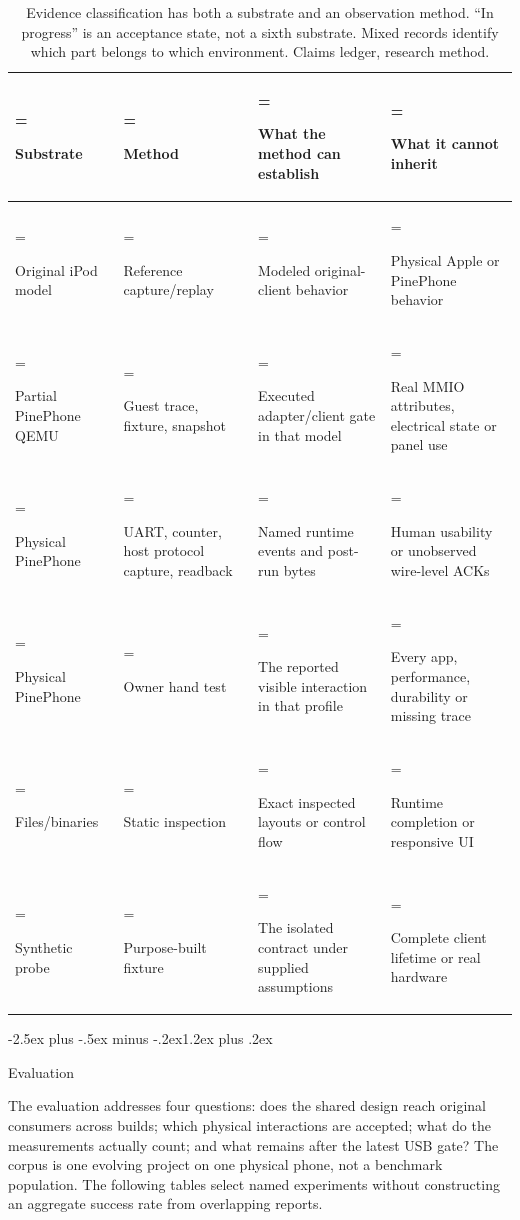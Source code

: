 \documentclass[10pt,letterpaper,twocolumn]{article}
\makeatletter
\renewcommand{\section}{\@startsection{section}{1}{0pt}
  {-2.5ex plus -.5ex minus -.2ex}{1.2ex plus .2ex}
  {\normalfont\large\bfseries\raggedright}}
\makeatother
\begin{document}
\begin{table}[t]
\centering
\caption[]{Evidence classification has both a substrate and an observation method. ``In progress'' is an acceptance state, not a sixth substrate. Mixed records identify which part belongs to which environment. Claims ledger, research method.}
\label{tab:2}
\setlength{\tabcolsep}{4pt}\renewcommand{\arraystretch}{1.08}
\begin{tabularx}{\linewidth}{@{}>{\hsize=0.85\hsize\linewidth=\hsize\raggedright\arraybackslash}X>{\hsize=0.85\hsize\linewidth=\hsize\raggedright\arraybackslash}X>{\hsize=1.15\hsize\linewidth=\hsize\raggedright\arraybackslash}X>{\hsize=1.15\hsize\linewidth=\hsize\raggedright\arraybackslash}X@{}}
\toprule
\textbf{Substrate} & \textbf{Method} & \textbf{What the method can establish} & \textbf{What it cannot inherit} \\
\midrule
Original iPod model & Reference capture/replay & Modeled original-client behavior & Physical Apple or PinePhone behavior \\
Partial PinePhone QEMU & Guest trace, fixture, snapshot & Executed adapter/client gate in that model & Real MMIO attributes, electrical state or panel use \\
Physical PinePhone & UART, counter, host protocol capture, readback & Named runtime events and post-run bytes & Human usability or unobserved wire-level ACKs \\
Physical PinePhone & Owner hand test & The reported visible interaction in that profile & Every app, performance, durability or missing trace \\
Files/binaries & Static inspection & Exact inspected layouts or control flow & Runtime completion or responsive UI \\
Synthetic probe & Purpose-built fixture & The isolated contract under supplied assumptions & Complete client lifetime or real hardware \\
\bottomrule
\end{tabularx}
\end{table}

\section{Evaluation}

The evaluation addresses four questions: does the shared design reach original consumers across builds; which physical interactions are accepted; what do the measurements actually count; and what remains after the latest USB gate? The corpus is one evolving project on one physical phone, not a benchmark population. The following tables select named experiments without constructing an aggregate success rate from overlapping reports.
\end{document}
